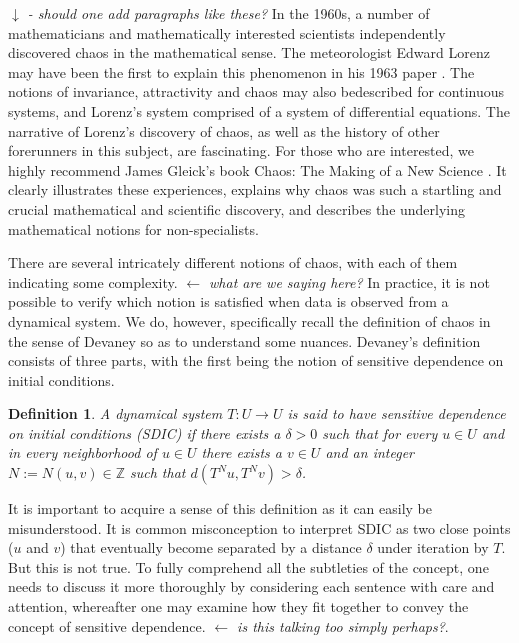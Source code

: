 \documentclass[12 pt]{article}
\newtheorem{Definition}{Definition}[]
\begin{document}
\emph{$\downarrow$ - should one add paragraphs like these?}
\newline In the 1960s, a number of mathematicians and mathematically interested scientists independently discovered chaos in the mathematical sense. The meteorologist Edward Lorenz may have been the first to explain this phenomenon in his 1963 paper \cite{lorenz1963deterministic}. The notions of invariance, attractivity and chaos may also bedescribed for continuous systems, and Lorenz's system comprised of a system of differential equations. The narrative of Lorenz's discovery of chaos, as well as the history of other forerunners in this subject, are fascinating. For those who are interested, we highly recommend James Gleick's book Chaos: The Making of a New Science \cite{gleick2008chaos}. It clearly illustrates these experiences, explains why chaos was such a startling and crucial mathematical and scientific discovery, and describes the underlying mathematical notions for non-specialists.

There are several intricately different notions of chaos, with each of them indicating some complexity. \emph{ $\leftarrow  $ what are we saying here?} In practice, it is not possible to verify which notion is satisfied when data is observed from a dynamical system. We do, however, specifically recall the definition of chaos in the sense of Devaney \cite{devaney2018introduction,de2013elements} so as to understand some nuances. Devaney's definition consists of three parts, with the first being the notion  of sensitive dependence on initial conditions. 

\begin{Definition} \rm 
A dynamical system $T: U \to U$ is said to have sensitive dependence on initial conditions (SDIC) if there exists a $\delta > 0$ such that for every $u \in U$ and in every neighborhood of $u \in U$ there exists a $v\in{U}$ and an integer $N:=N{(u,v)}\in\mathbb{Z}$ such that $d(T^Nu,T^Nv)>\delta$. 	
\end{Definition}

It is important to acquire a sense of this definition as it can easily be misunderstood. It is common misconception to interpret SDIC as two close points ($u$ and $v$) that eventually become separated by a distance $\delta$ under iteration by $T$. But this is not true. To fully comprehend all the subtleties of the concept, one needs to discuss it more thoroughly by considering each sentence with care and attention, whereafter one may examine how they fit together to convey the concept of sensitive dependence. \emph{ $\leftarrow$ is this talking too simply perhaps?}. 
\end{document}
